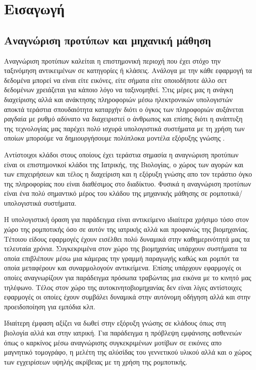
\chapter{Εισαγωγή}

\section{Αναγνώριση προτύπων και μηχανική μάθηση}
\par
Αναγνώριση προτύπων καλείται η επιστημονική περιοχή που έχει στόχο την ταξινόμηση αντικειμένων σε κατηγορίες ή κλάσεις. Ανάλογα με την κάθε εφαρμογή τα δεδομένα μπορεί να είναι είτε εικόνες, είτε σήματα είτε οποιοδήποτε άλλο σετ δεδομένων χρειάζεται για κάποιο λόγο να ταξινομηθεί. Στις μέρες μας η ανάγκη διαχείρισης αλλά και ανάκτησης πληροφοριών μέσω ηλεκτρονικών υπολογιστών αποκτά τεράστια σπουδαιότητα καταρχήν διότι ο όγκος των πληροφοριών αυξάνεται ραγδαία με ρυθμό αδύνατο να διαχειριστεί ο άνθρωπος και επίσης διότι η ανάπτυξη της τεχνολογίας μας παρέχει πολύ ισχυρά υπολογιστικά συστήματα με τη χρήση των οποίων μπορούμε να δημιουργήσουμε πολύπλοκα μοντέλα εξόρυξης γνώσης . 
\par
Αντίστοιχοι κλάδοι στους οποίους έχει τεράστια σημασία η αναγνώριση προτύπων είναι οι επιστημονικοί κλάδοι της Ιατρικής, της Βιολογίας, ο χώρος των αγορών και των επιχειρήσεων και τέλος η διαχείριση και η εξόρυξη γνώσης απο τον τεράστιο όγκο της πληροφορίας που είναι διαθέσιμος στο διαδίκτυο. Φυσικά η αναγνώριση προτύπων είναι ένα πολύ σημαντικό μέρος του κλάδου της μηχανικής μάθησης σε ρομποτικά/υπολογιστικά συστήματα.
\par
Η υπολογιστική όραση για παράδειγμα είναι αντικείμενο ιδιαίτερα χρήσιμο τόσο στον χώρο της ρομποτικής όσο σε αυτόν της ιατρικής αλλά και προφανώς της βιομηχανίας. Τέτοιου είδους εφαρμογές έχουν εισέλθει πολύ δυναμικά στην καθημερινότητά μας τα τελευταία χρόνια. Συγκεκριμένα στον χώρο της βιομηχανίας υπάρχουν συστήματα τα οποία επιβλέπουν μέσω μια κάμερας την γραμμή παραγωγής καθώς και ρομπότ τα οποία μεταφέρουν και συναρμολογούν αντικείμενα. Eπίσης υπάρχουν εφαρμογές οι οποίες αναγνωρίζουν για παράδειγμα πρόσωπα τραβώντας μια εικόνα με το κινητό μας τηλέφωνο. Τέλος στον χώρο της αυτοκινητοβιομηχανίας δεν είναι λίγες αντίστοιχες εφαρμογές οι οποίες έχουν συμβάλει δυναμικά στην αυτόνομη οδήγηση αλλά και στην προειδοποίηση για εμπόδια κλπ.
\par
Ιδιαίτερη έμφαση αξίζει να δωθεί στην εξόρυξη γνώσης σε κλάδους όπως στη βιολογία αλλά και στην ιατρική. Για παράδειγμα η πρόβλεψη εμφάνισης ασθενειών όπως ο καρκίνος μέσω αναγνώρισης συγκεκριμένων μοτίβων σε εικόνες απο μαγνητικό τομογράφο, η μελέτη της αλύσίδας του γεννετικού υλικού αλλά και ο χώρος των εγχειρίσεων υψηλής ακρίβειας με τη χρήση της ρομποτικής.

